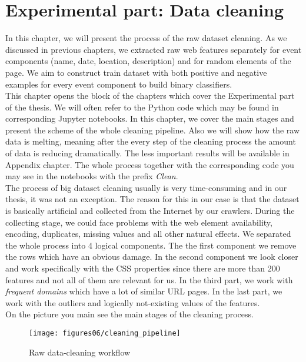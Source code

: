 \chapter{Experimental part: Data cleaning}
\label{chap:clean}
In this chapter, we will present the process of the raw dataset cleaning. As we discussed in previous chapters, we extracted raw web features separately for event components (name, date, location, description) and for random elements of the page. We aim to construct train dataset with both positive and negative examples for every event component to build binary classifiers. \\

This chapter opens the block of the chapters which cover the Experimental part of the thesis. We will often refer to the Python code which may be found in corresponding Jupyter notebooks. In this chapter, we cover the main stages and present the scheme of the whole cleaning pipeline. Also we will show how the raw data is melting, meaning after the every step of the cleaning process the amount of data is reducing dramatically. The less important results will be available in Appendix chapter. The whole process together with the corresponding code you may see in the notebooks with the prefix \textit{Clean}.\\

The process of big dataset cleaning usually is very time-consuming and in our thesis, it was not an exception. The reason for this in our case is that the dataset is basically artificial and collected from the Internet by our crawlers. During the collecting stage, we could face problems with the web element availability, encoding, duplicates, missing values and all other natural effects. We separated the whole process into 4 logical components. The the first component we remove the rows which have an obvious damage. In the second component we look closer and work specifically with the CSS properties since there are more than 200 features and not all of them are relevant for us. In the third part, we work with \textit{frequent domains} which have a lot of similar URL pages. In the last part, we work with the outliers and logically not-existing values of the features. \\

On the picture  you main see the main stages of the cleaning process.



\begin{figure}[h]
\begin{center}
\texttt{[image: figures06/cleaning\_pipeline]}
\caption{Raw data-cleaning workflow}
\label{fig:clean}
\end{center}
\end{figure}

